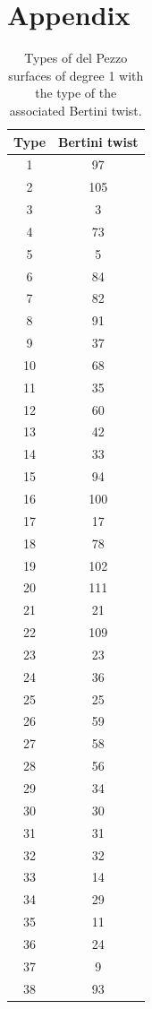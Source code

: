 \documentclass[a4paper, 11pt, reqno]{amsart}
\numberwithin{equation}{section} \numberwithin{figure}{section}
\theoremstyle{definition}
\numberwithin{lemma}{section}
\begin{document}
\printbibliography[heading=bibintoc]


\section*{Appendix}\label{sec:appendix}
\begin{table}[ht]
    \centering
    \caption{Types of del Pezzo surfaces of degree 1 with the type of the associated Bertini twist.}
    \begin{minipage}{0.32\textwidth}
        \begin{tabular}{|c|c|}
        \hline
         Type & Bertini twist\\
         \hline
              1 & 97 \\
2 & 105 \\
3 & 3 \\
4 & 73 \\
5 & 5 \\
6 & 84 \\
7 & 82 \\
8 & 91 \\
9 & 37 \\
10 & 68 \\
11 & 35 \\
12 & 60 \\
13 & 42 \\
14 & 33 \\
15 & 94 \\
16 & 100 \\
17 & 17 \\
18 & 78 \\
19 & 102 \\
20 & 111 \\
21 & 21 \\
22 & 109 \\
23 & 23 \\
24 & 36 \\
25 & 25 \\
26 & 59 \\
27 & 58 \\
28 & 56 \\
29 & 34 \\
30 & 30 \\
31 & 31 \\
32 & 32 \\
33 & 14 \\
34 & 29 \\
35 & 11 \\
36 & 24 \\
37 & 9 \\
38 & 93\\

\end{tabular}
\end{minipage}
\end{table}
\end{document}
